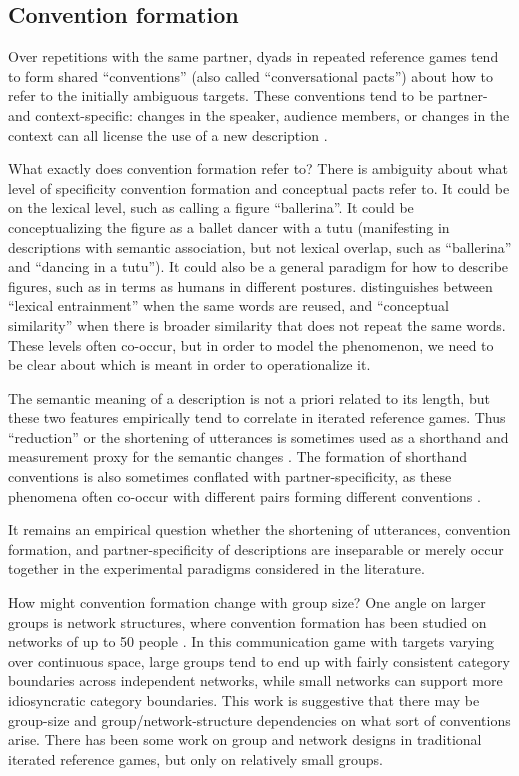 \documentclass[]{article}
\begin{document}
\subsection{Convention formation}
Over repetitions with the same partner, dyads in repeated reference games tend to form shared ``conventions'' (also called ``conversational pacts'') about how to refer to the initially ambiguous targets. These conventions tend to be partner- and context-specific: changes in the speaker, audience members, or changes in the context can all license the use of a new description \citep{metzing2003a, ibarra2016, yoon2014}.

What exactly does convention formation refer to? There is ambiguity about what level of specificity convention formation and conceptual pacts refer to. It could be on the lexical level, such as calling a figure ``ballerina''. It could be conceptualizing the figure as a ballet dancer with a tutu (manifesting in descriptions with semantic association, but not lexical overlap, such as ``ballerina'' and ``dancing in a tutu''). It could also be a general paradigm for how to describe figures, such as in terms as humans in different postures.  \citet{horton2002a} distinguishes between ``lexical entrainment'' when the same words are reused, and ``conceptual similarity'' when there is broader similarity that does not repeat the same words. These levels often co-occur, but in order to model the phenomenon, we need to be clear about which is meant in order to operationalize it.  

The semantic meaning of a description is not a priori related to its length, but these two features empirically tend to correlate in iterated reference games\citep{TODO}.  Thus ``reduction'' or the shortening of utterances is sometimes used as a shorthand and measurement proxy for the semantic changes \citep{TODO}. The formation of shorthand conventions is also sometimes conflated with partner-specificity, as these phenomena often co-occur with different pairs forming different conventions \citet{}. 

It remains an empirical question whether the shortening of utterances, convention formation, and partner-specificity of descriptions are inseparable or merely occur together in the experimental paradigms considered in the literature. 

How might convention formation change with group size? One angle on larger groups is network structures, where convention formation has been studied on networks of up to 50 people \citep{guilbeault2021}. In this communication game with targets varying over continuous space, large groups tend to end up with fairly consistent category boundaries across independent networks, while small networks can support more idiosyncratic category boundaries. This work is suggestive that there may be group-size and group/network-structure dependencies on what sort of conventions arise. There has been some work on group and network designs in traditional iterated reference games, but only on relatively small groups. 
\end{document}
